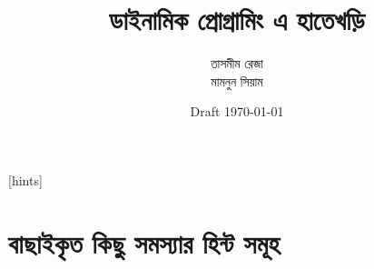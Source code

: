 \documentclass[twoside,12pt,a4paper]{book}
\title{\Huge ডাইনামিক প্রোগ্রামিং এ হাতেখড়ি}
\author{\Large তাসমীম রেজা \\ \Large মামনুন সিয়াম}
\date{Draft \today}
\theoremstyle{definition}
\theoremstyle{definition}
\theoremstyle{definition}
\theoremstyle{definition}
\theoremstyle{definition}
\theoremstyle{definition}
\theoremstyle{definition}
\theoremstyle{definition}
\theoremstyle{definition}
\theoremstyle{definition}
\theoremstyle{definition}
\theoremstyle{definition}
\theoremstyle{definition}
\theoremstyle{definition}
\theoremstyle{definition}
\theoremstyle{definition}
\theoremstyle{definition}
\theoremstyle{definition}
\begin{document}
\frontmatter
\maketitle

\mainmatter

% 
% 
% 

[hints]

% 









\part{বাছাইকৃত কিছু সমস্যার হিন্ট সমূহ}



% 
% 
\end{document}

